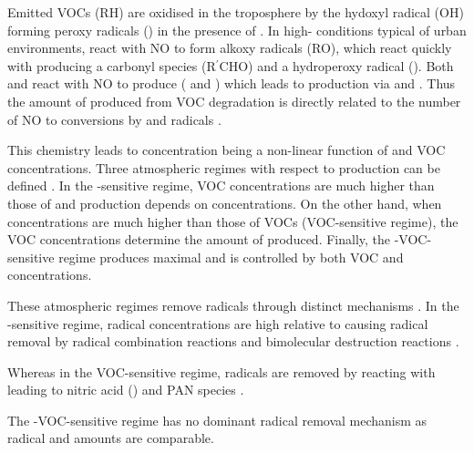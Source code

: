 Emitted VOCs (RH) are oxidised in the troposphere by the hydoxyl radical (OH) forming peroxy radicals () in the presence of  . 
In high- conditions typical of urban environments,  react with NO  to form alkoxy radicals (RO), which react quickly with   producing a carbonyl species (R$^{\prime}$CHO) and a hydroperoxy radical ().
Both  and  react with NO to produce  ( and ) which leads to  production via  and . 
Thus the amount of  produced from VOC degradation is directly related to the number of NO to  conversions by  and  radicals \citep{Atkinson:2000}.
\begin{reactionlist}
\end{reactionlist}

This chemistry leads to  concentration being a non-linear function of  and VOC concentrations.
Three atmospheric regimes with respect to  production can be defined \citep{Jenkin:2000}. 
In the -sensitive regime, VOC concentrations are much higher than those of  and  production depends on  concentrations. 
On the other hand, when  concentrations are much higher than those of VOCs (VOC-sensitive regime), the VOC concentrations determine the amount of  produced.
Finally, the -VOC-sensitive regime produces maximal  and is controlled by both VOC and  concentrations.

These atmospheric regimes remove radicals through distinct mechanisms \citep{Kleinman:1991}. 
In the -sensitive regime, radical concentrations are high relative to  causing radical removal by radical combination reactions  and bimolecular destruction reactions  \citep{Kleinman:1994}.
\vspace{-5mm}
\begin{reactionlist}
\end{reactionlist}
Whereas in the VOC-sensitive regime, radicals are removed by reacting with  leading to nitric acid ()  and PAN species .
\vspace{-3mm}
\begin{reactionlist}
\end{reactionlist}
The -VOC-sensitive regime has no dominant radical removal mechanism as radical and  amounts are comparable.

